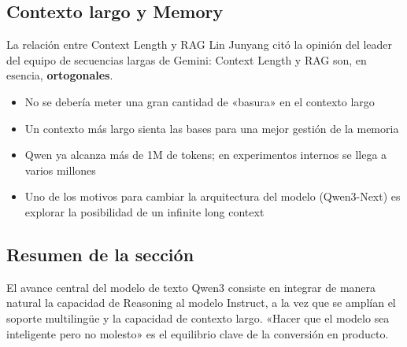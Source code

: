 \subsection{Contexto largo y Memory}

\begin{knowledgebox}{La relación entre Context Length y RAG}
Lin Junyang citó la opinión del leader del equipo de secuencias largas de Gemini: Context Length y RAG son, en esencia, \textbf{ortogonales}.
\begin{itemize}
    \item No se debería meter una gran cantidad de «basura» en el contexto largo
    \item Un contexto más largo sienta las bases para una mejor gestión de la memoria
    \item Qwen ya alcanza más de 1M de tokens; en experimentos internos se llega a varios millones
    \item Uno de los motivos para cambiar la arquitectura del modelo (Qwen3-Next) es explorar la posibilidad de un infinite long context
\end{itemize}
\end{knowledgebox}

\subsection{Resumen de la sección}

El avance central del modelo de texto Qwen3 consiste en integrar de manera natural la capacidad de Reasoning al modelo Instruct, a la vez que se amplían el soporte multilingüe y la capacidad de contexto largo. «Hacer que el modelo sea inteligente pero no molesto» es el equilibrio clave de la conversión en producto.

